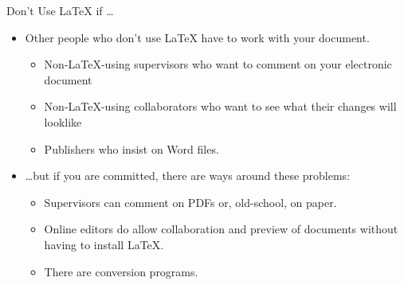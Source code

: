 \begin{frame}[fragile]{Don't Use \LaTeX{} if \dots}

\begin{itemize}
\item Other people who don't use \LaTeX{} have to work with your document.
\begin{itemize}
\item Non-\LaTeX-using supervisors who want to comment on your 
electronic document
\item Non-\LaTeX-using collaborators who want to see what their 
changes will looklike
\item {\color{red} Publishers who insist on Word files.}
\end{itemize}
\item \dots but if you are committed, there are ways around these problems:
\begin{itemize}
\item Supervisors can comment on PDFs or, old-school, on paper.
\item Online editors do allow collaboration and preview of documents
  without having to install \LaTeX.
\item There are conversion programs.
\end{itemize}
\end{itemize}

\end{frame}

